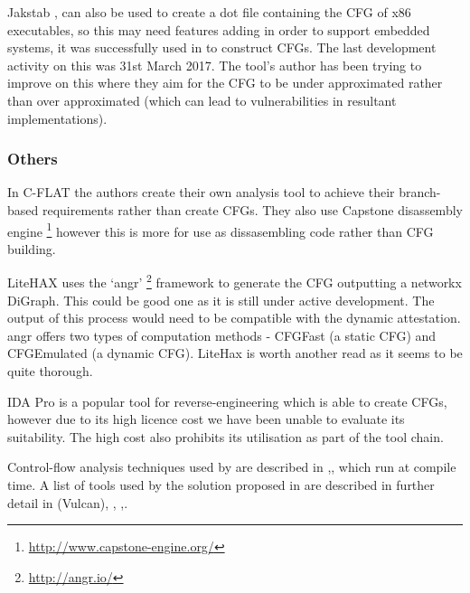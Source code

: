 Jakstab \cite{Kinder2008},\cite{Kinder2010} can also be used to create a dot file containing the CFG of x86 executables, so this may need features adding in order to support embedded systems, it was successfully used in \cite{Nguyen2013} to construct CFGs. The last development activity on this was 31st March 2017. The tool's author has been trying to improve on this where they aim for the CFG to be under approximated \cite{Kinder2012} rather than over approximated (which can lead to vulnerabilities in resultant implementations).

\subsubsection{Others}

In C-FLAT \cite{Abera2016} the authors create their own analysis tool to achieve their branch-based requirements rather than create CFGs. They also use Capstone disassembly engine \footnote{\url{http://www.capstone-engine.org/}} however this is more for use as dissasembling code rather than CFG building.

LiteHAX \cite{Dessouky2018} uses the `angr' \footnote{\url{http://angr.io/}} \cite{Shoshitaishvili2016} framework to generate the CFG outputting a networkx DiGraph. This could be good one as it is still under active development. The output of this process would need to be compatible with the dynamic attestation. angr offers two types of computation methods - CFGFast (a static CFG) and CFGEmulated (a dynamic CFG). LiteHax is worth another read as it seems to be quite thorough.

IDA Pro is a popular tool for reverse-engineering which is able to create CFGs, however due to its high licence cost we have been unable to evaluate its suitability. The high cost also prohibits its utilisation as part of the tool chain.

Control-flow analysis techniques used by \cite{Abadi2005} are described in \cite{AhoAlfredV.2014C:pt},\cite{Atkinson},\cite{Wagner2002} which run at compile time. A list of tools used by the solution proposed in \cite{Abadi2005} are described in further detail in \cite{Edwards2001}(Vulcan), \cite{AhoAlfredV.2014C:pt},\cite{Feng2003} \cite{Gopalakrishna2005},\cite{Wagner2002}.
